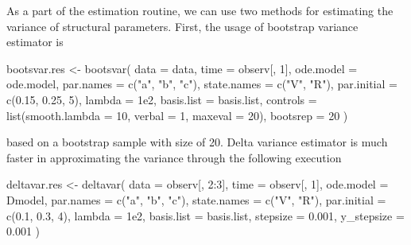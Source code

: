 As a part of the estimation routine, we can use two methods for estimating the variance of structural parameters. First, the usage of bootstrap variance estimator is 
\begin{example*}
bootsvar.res <- bootsvar(
  data = data, time = observ[, 1], ode.model = ode.model,
  par.names = c("a", "b", "c"), state.names = c("V", "R"),
  par.initial = c(0.15, 0.25, 5), lambda = 1e2, basis.list = basis.list,
  controls = list(smooth.lambda = 10, verbal = 1, maxeval = 20), bootsrep = 20
)

\end{example*}
based on a bootstrap sample with size of 20. Delta variance estimator is much faster in approximating the variance through the following execution
\begin{example*}
deltavar.res <- deltavar(
  data = observ[, 2:3], time = observ[, 1], ode.model = Dmodel,
  par.names = c("a", "b", "c"), state.names = c("V", "R"), par.initial = c(0.1, 0.3, 4),
  lambda = 1e2, basis.list = basis.list,
  stepsize = 0.001, y_stepsize = 0.001
)
\end{example*}



